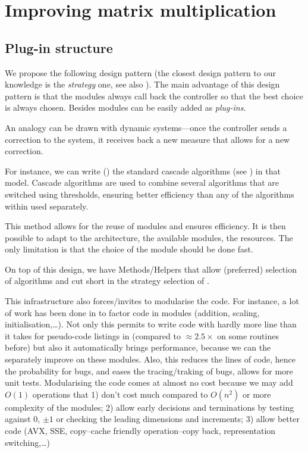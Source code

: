 \section{Improving \linbox matrix multiplication}\label{sec:matmul}
%
%
\subsection{Plug-in structure}
%
We propose the following design pattern (the closest design pattern to our
knowledge is the \emph{strategy} one, see also \cite[Fig 2.]{Cung:2006:TC}).
The main advantage of this design pattern is that the modules always call back
the controller so that the best choice is always chosen.  Besides modules can
be easily added as \emph{plug-ins}.
%

%
An analogy can be drawn with dynamic
systems---once the controller sends a correction to the system, it receives
back a new measure that allows for a new correction.
%
%
%
\par
%
For instance, we can write () the standard cascade algorithms
(see \cite{Dumas:2008:Flas}) in that model. Cascade algorithms are used to combine
several algorithms that are switched using thresholds, ensuring better
efficiency than any of the algorithms within used separately.
%
%

%
This method allows for the reuse of modules and ensures efficiency.
It is then possible to adapt to the architecture, the available modules,
the resources. The only limitation is that the choice of the module
should be done fast.
%
\par
%
On top of this design, we have Methods/Helpers that allow (preferred) selection
of algorithms and cut short in the strategy selection of .
%
%
%
\par
%
This infrastructure also forces/invites to modularise the code. For instance, a lot
of work has been done in \fflasffpack to factor code in modules (addition,
scaling, initialisation,\ldots). Not only this permits to write code with
hardly more line than it takes for pseudo-code listings in
\cite{Boyer:2009:sched} (compared to $\approx 2.5\times$ on some routines
before) but also it automatically brings performance, because we can the
separately improve on these modules. Also, this reduces the lines of code,
hence the probability for bugs, and eases the tracing/traking of bugs, allows
for more unit tests. Modularising the code comes at almost no cost because we
may add $O(1)$  operations that 1) don't cost much compared to $O(n^2)$ or more
complexity of the modules; 2) allow early decisions and terminations by testing
against $0$, $\pm 1$ or checking the leading dimensions and increments; 3)
allow better code (AVX, SSE, copy--cache friendly operation--copy back,
representation switching,\ldots)
%

